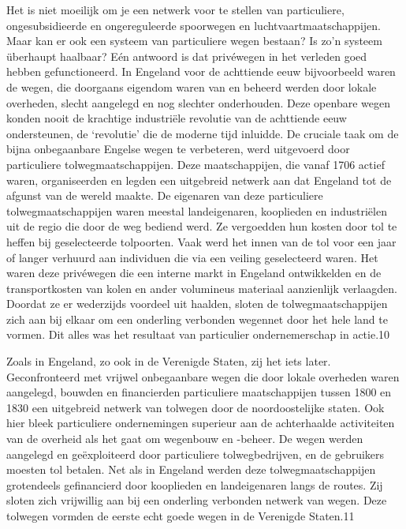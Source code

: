\documentclass[
  a5paper,
  smalldemyvopaper,10pt,twoside,onecolumn,openright,extrafontsizes,hidelinks]{memoir}
\begin{document}
Het is niet moeilijk om je een netwerk voor te stellen van particuliere,
ongesubsidieerde en ongereguleerde spoorwegen en
luchtvaartmaatschappijen. Maar kan er ook een systeem van particuliere
wegen bestaan? Is zo'n systeem überhaupt haalbaar? Eén antwoord is dat
privéwegen in het verleden goed hebben gefunctioneerd. In Engeland voor
de achttiende eeuw bijvoorbeeld waren de wegen, die doorgaans eigendom
waren van en beheerd werden door lokale overheden, slecht aangelegd en
nog slechter onderhouden. Deze openbare wegen konden nooit de krachtige
industriële revolutie van de achttiende eeuw ondersteunen, de
`revolutie' die de moderne tijd inluidde. De cruciale taak om de bijna
onbegaanbare Engelse wegen te verbeteren, werd uitgevoerd door
particuliere tolwegmaatschappijen. Deze maatschappijen, die vanaf 1706
actief waren, organiseerden en legden een uitgebreid netwerk aan dat
Engeland tot de afgunst van de wereld maakte. De eigenaren van deze
particuliere tolwegmaatschappijen waren meestal landeigenaren,
kooplieden en industriëlen uit de regio die door de weg bediend werd. Ze
vergoedden hun kosten door tol te heffen bij geselecteerde tolpoorten.
Vaak werd het innen van de tol voor een jaar of langer verhuurd aan
individuen die via een veiling geselecteerd waren. Het waren deze
privéwegen die een interne markt in Engeland ontwikkelden en de
transportkosten van kolen en ander volumineus materiaal aanzienlijk
verlaagden. Doordat ze er wederzijds voordeel uit haalden, sloten de
tolwegmaatschappijen zich aan bij elkaar om een onderling verbonden
wegennet door het hele land te vormen. Dit alles was het resultaat van
particulier ondernemerschap in actie.10

Zoals in Engeland, zo ook in de Verenigde Staten, zij het iets later.
Geconfronteerd met vrijwel onbegaanbare wegen die door lokale overheden
waren aangelegd, bouwden en financierden particuliere maatschappijen
tussen 1800 en 1830 een uitgebreid netwerk van tolwegen door de
noordoostelijke staten. Ook hier bleek particuliere ondernemingen
superieur aan de achterhaalde activiteiten van de overheid als het gaat
om wegenbouw en -beheer. De wegen werden aangelegd en geëxploiteerd door
particuliere tolwegbedrijven, en de gebruikers moesten tol betalen. Net
als in Engeland werden deze tolwegmaatschappijen grotendeels
gefinancierd door kooplieden en landeigenaren langs de routes. Zij
sloten zich vrijwillig aan bij een onderling verbonden netwerk van
wegen. Deze tolwegen vormden de eerste echt goede wegen in de Verenigde
Staten.11

\end{document}
